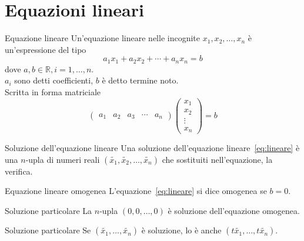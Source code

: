
\section{Equazioni lineari}%
\label{sec:equazioni_lineari}

\begin{Def}{Equazione lineare}
  Un'equazione lineare nelle incognite $x_1,x_2,\ldots,x_n$ è un'espressione del tipo
  \begin{equation}\label{eq:lineare}
    a_1x_1+a_2x_2+\cdots+a_n x_n=b
  \end{equation}
  dove $a,b\in\mathbb{R}, i=1,\ldots,n$.\\
  $a_i$ sono detti coefficienti, $b$ è detto termine noto.\\
  Scritta in forma matriciale
  \begin{equation*}
    \begin{pmatrix}
      a_1&a_2&a_3&\cdots&a_n
    \end{pmatrix}
    \begin{pmatrix}
      x_1\\x_2\\\vdots\\x_n
    \end{pmatrix}
    = b
  \end{equation*}
\end{Def}

\begin{Def}{Soluzione dell'equazione lineare}
  Una soluzione dell'equazione lineare~\eqref{eq:lineare} è una $n$-upla di numeri reali
  $(\tilde{x_1},\tilde{x_2},\ldots,\tilde{x_n})$ che sostituiti nell'equazione, la
  verifica.
\end{Def}

\begin{Def}{Equazione lineare omogenea}
  L'equazione~\eqref{eq:lineare} si dice omogenea se $b=0$.
\end{Def}

\begin{SubDef}{Soluzione particolare}
  La $n$-upla $(0,0,\ldots,0)$ è soluzione dell'equazione omogenea.
\end{SubDef}

\begin{SubDef}{Soluzione particolare}
  Se $(\tilde{x_1},\ldots,\tilde{x_n})$ è soluzione, lo è anche
  $(t\tilde{x_1},\ldots,t\tilde{x_n})$.
\end{SubDef}
